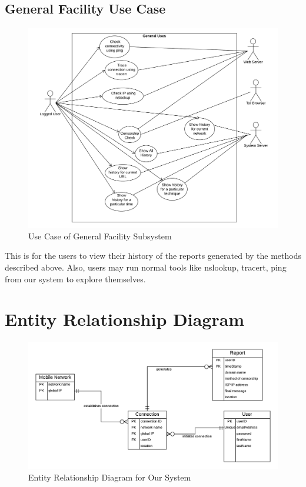 \documentclass[12pt]{article}
\begin{document}
\newpage
\subsection{General Facility Use Case}

\begin{figure}[h]
    \centering
    \includegraphics[width=\textwidth]{ucgc.png}
    \caption{Use Case of General Facility Subsystem}
    \label{fig:ucgc}
\end{figure}
This is for the users to view their history of the reports generated by the methods described above. Also, users may run normal tools like nslookup, tracert, ping from our system to explore themselves.

\newpage
\section{Entity Relationship Diagram}

\begin{figure}[h]
    \centering
    \includegraphics[width=\textwidth]{ERD.png}
    \caption{Entity Relationship Diagram for Our System}
    \label{fig:erd}
\end{figure}
\end{document}
